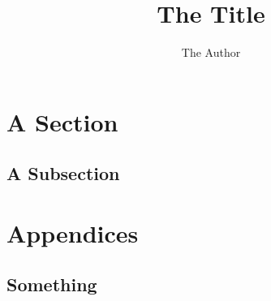 \documentclass[12pt]{article}
\title{The Title}
\author{The Author}
\newcommand{\sectiontitle}{}
\newcommand{\nnewsection}[1]{\section*{#1}\renewcommand{\sectiontitle}{#1}}
\begin{document}
\maketitle
\thispagestyle{empty}

\newpage
{}

\renewcommand{\sectiontitle}{Contents}
\tableofcontents

\newpage
{}

\section{A Section}

\subsection{A Subsection}

\newpage
\printbibliography
{}

\appendix
\nnewsection{Appendices}
\renewcommand{\thesubsection}{\Alph{subsection}}

\subsection{Something}
\end{document}
